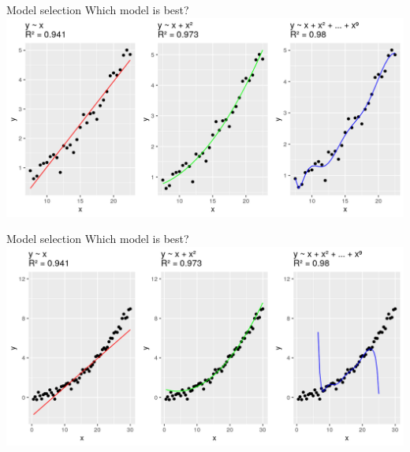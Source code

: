 \documentclass[10pt]{beamer}
\begin{document}
\begin{frame}{Model selection}
  Which model is best?
  \includegraphics[width=\textwidth]{cedas-model-1.png}
\end{frame}

\begin{frame}{Model selection}
  Which model is best?
  \includegraphics[width=\textwidth]{cedas-model-2.png}
\end{frame}
\end{document}
